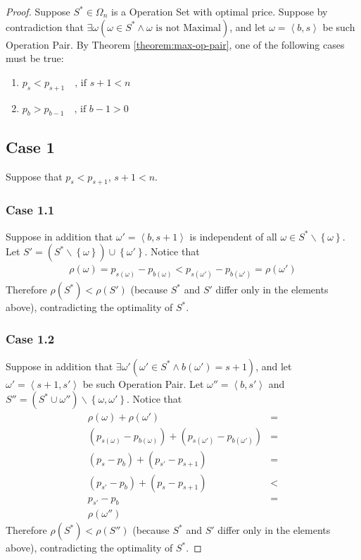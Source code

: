 \documentclass{article}
\newcommand{\tuple}[1]{\ensuremath{\left\langle #1 \right\rangle}}
\newcommand{\Set}[1]{\ensuremath{\left\{ #1 \right\}}}
\newcommand{\tref}[1]{Theorem \ref{#1}\xspace}
\newcommand{\op}{\ensuremath{\omega}}
\renewcommand{\b}[1]{\ensuremath{b\left( #1 \right)}}
\newcommand{\s}[1]{\ensuremath{s\left( #1 \right)}}
\newcommand{\price}[1]{\ensuremath{\rho\left( #1 \right)}}
\newcommand{\OS}{\ensuremath{\Omega_{n}}}
\newcommand{\pricep}[1]{\ensuremath{p_{\s{#1}} - p_{\b{#1}}}}
\newcommand{\sopt}{\ensuremath{S^{*}}}
\theoremstyle{definition}
\theoremstyle{plain}
\begin{document}
\begin{proof}
    Suppose $\sopt \in \OS$ is a Operation Set with optimal price. Suppose by contradiction that $\exists \op \left( \op \in \sopt \land \op \mbox{ is not Maximal} \right)$, and let $\op = \tuple{b, s}$ be such Operation Pair. By \tref{theorem:max-op-pair}, one of the following cases must be true:
    \begin{enumerate}
        \item $p_s < p_{s+1} \quad \mbox{, if } s+1 < n$
        \item $p_b > p_{b-1} \quad \mbox{, if } b-1 > 0$
    \end{enumerate}

    \subsection*{Case 1} \label{proof:opt-price-I-case-1}
    Suppose that $p_s < p_{s+1}$, $s+1 < n$.
    
    \subsubsection*{Case 1.1}
    Suppose in addition that $\op' = \tuple{b, s+1}$ is independent of all $\op \in \sopt \backslash \Set{\op}$. Let $S' = (\sopt \backslash \Set{\op}) \cup \Set{\op'}$. Notice that 
    \begin{align}
        \price{\op} = \pricep{\op} < \pricep{\op'} = \price{\op'} 
    \end{align}
    Therefore $\price{\sopt} < \price{S'}$ (because $\sopt$ and $S'$ differ only in the elements above), contradicting the optimality of $\sopt$.
    
    \subsubsection*{Case 1.2}
    Suppose in addition that $\exists \op'(\op' \in \sopt \land \b{\op'} = s + 1)$, and let $\op' = \tuple{s+1, s'}$ be such Operation Pair. Let $\op'' = \tuple{b, s'}$ and $S'' = (\sopt \cup {\op''}) \backslash \Set{\op, \op'}$. Notice that
    \begin{align}
        \price{\op} + \price{\op'} & = \\\nonumber
        (\pricep{\op}) + (\pricep{\op'}) & = \\\nonumber
        (p_{s} - p_{b}) + (p_{s'} - p_{s+1}) & = \\\nonumber
        (p_{s'} - p_{b}) + (p_{s} - p_{s+1}) & < \\\nonumber
        p_{s'} - p_{b} & = \\\nonumber
        \price{\op''}
    \end{align}
    Therefore $\price{\sopt} < \price{S''}$ (because $\sopt$ and $S'$ differ only in the elements above), contradicting the optimality of $\sopt$.


\end{proof}
\end{document}

